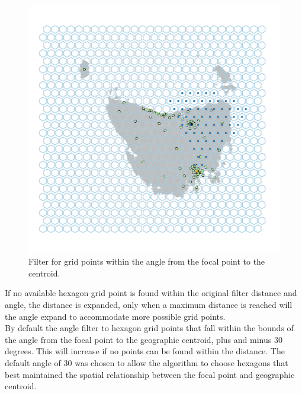 \documentclass[
]{jss}
\begin{document}
\begin{CodeChunk}
\begin{figure}

{\centering \includegraphics[width=1\linewidth]{figures/5allocate} 

}

\caption[Filter for grid points within the angle from the focal point to the centroid]{Filter for grid points within the angle from the focal point to the centroid.}\label{fig:angles}
\end{figure}
\end{CodeChunk}

If no available hexagon grid point is found within the original filter
distance and angle, the distance is expanded, only when a maximum
distance is reached will the angle expand to accommodate more possible
grid points.\\
By default the angle filter to hexagon grid points that fall within the
bounds of the angle from the focal point to the geographic centroid,
plus and minus 30 degrees. This will increase if no points can be found
within the  distance. The default angle of 30 was
chosen to allow the algorithm to choose hexagons that best maintained
the spatial relationship between the focal point and geographic
centroid.
\end{document}
